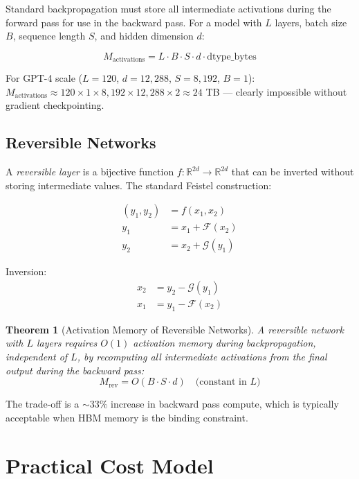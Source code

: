 \documentclass[11pt,a4paper]{article}
\newtheorem{theorem}{Theorem}
\begin{document}
Standard backpropagation must store all intermediate activations during the
forward pass for use in the backward pass. For a model with $L$ layers,
batch size $B$, sequence length $S$, and hidden dimension $d$:

\[
  M_\text{activations} = L \cdot B \cdot S \cdot d \cdot \text{dtype\_bytes}
\]

For GPT-4 scale ($L=120$, $d=12{,}288$, $S=8{,}192$, $B=1$):
$M_\text{activations} \approx 120 \times 1 \times 8{,}192 \times 12{,}288 \times 2
\approx 24$ TB — clearly impossible without gradient checkpointing.

\subsection{Reversible Networks}

A \textit{reversible layer} \citep{gomez2017reversible} is a bijective
function $f: \mathbb{R}^{2d} \to \mathbb{R}^{2d}$ that can be inverted
without storing intermediate values. The standard Feistel construction:

\begin{align}
  (y_1, y_2) &= f(x_1, x_2) \\
  y_1 &= x_1 + \mathcal{F}(x_2) \\
  y_2 &= x_2 + \mathcal{G}(y_1)
\end{align}

Inversion:
\begin{align}
  x_2 &= y_2 - \mathcal{G}(y_1) \\
  x_1 &= y_1 - \mathcal{F}(x_2)
\end{align}

\begin{theorem}[Activation Memory of Reversible Networks]
A reversible network with $L$ layers requires $O(1)$ activation memory
during backpropagation, independent of $L$, by recomputing all intermediate
activations from the final output during the backward pass:
\[
  M_\text{rev} = O(B \cdot S \cdot d) \quad \text{(constant in } L\text{)}
\]
\end{theorem}

The trade-off is a $\sim 33\%$ increase in backward pass compute, which is
typically acceptable when HBM memory is the binding constraint.

\section{Practical Cost Model}
\label{sec:practical}
\end{document}
